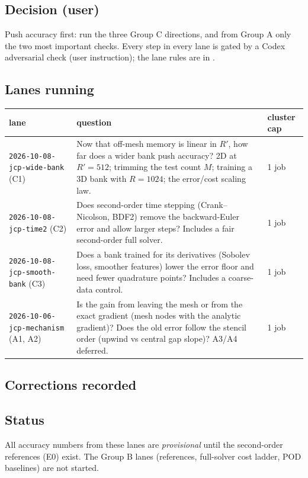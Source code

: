 
\subsection*{Decision (user)}
Push accuracy first: run the three Group C directions, and from Group A only the two most important checks.
Every step in every lane is gated by a Codex adversarial check (user instruction); the lane rules are in
.

\subsection*{Lanes running}
\begin{tabularx}{\linewidth}{@{}l X l@{}}
\toprule
lane & question & cluster cap\\
\midrule
\texttt{2026-10-08-jcp-wide-bank} (C1) & Now that off-mesh memory is linear in $R'$, how far does a wider bank push accuracy? 2D at $R'=512$; trimming the test count $M$; training a 3D bank with $R=1024$; the error/cost scaling law. & 1 job\\
\texttt{2026-10-08-jcp-time2} (C2) & Does second-order time stepping (Crank--Nicolson, BDF2) remove the backward-Euler error and allow larger steps? Includes a fair second-order full solver. & 1 job\\
\texttt{2026-10-08-jcp-smooth-bank} (C3) & Does a bank trained for its derivatives (Sobolev loss, smoother features) lower the error floor and need fewer quadrature points? Includes a coarse-data control. & 1 job\\
\texttt{2026-10-06-jcp-mechanism} (A1, A2) & Is the gain from leaving the mesh or from the exact gradient (mesh nodes with the analytic gradient)? Does the old error follow the stencil order (upwind vs central gap slope)? A3/A4 deferred. & 1 job\\
\bottomrule
\end{tabularx}

\subsection*{Corrections recorded}

\subsection*{Status}
All accuracy numbers from these lanes are \emph{provisional} until the second-order references (E0) exist.
The Group B lanes (references, full-solver cost ladder, POD baselines) are not started.
